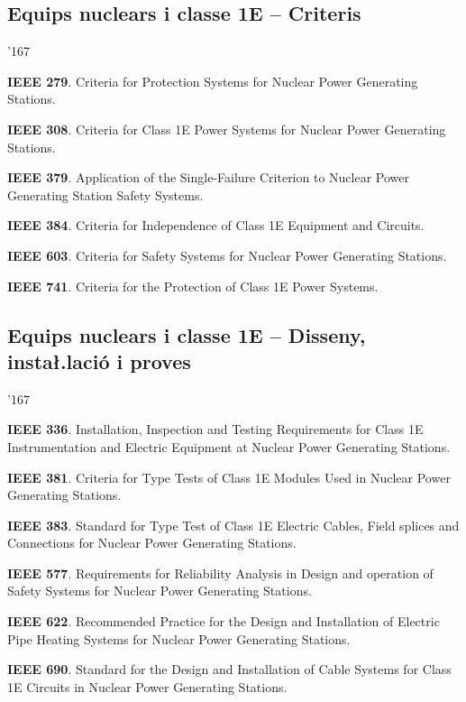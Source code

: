 \subsection*{Equips nuclears i classe 1E -- Criteris} 
\begin{dinglist}{'167}
    \item \textbf{IEEE 279}. Criteria for Protection Systems for Nuclear Power Generating Stations.
    \item \textbf{IEEE 308}. Criteria for Class 1E Power Systems for Nuclear Power Generating Stations.
    \item \textbf{IEEE 379}. Application of the Single-Failure Criterion to Nuclear Power Generating Station Safety Systems.
    \item \textbf{IEEE 384}. Criteria for Independence of Class 1E Equipment and Circuits.
    \item \textbf{IEEE 603}. Criteria for Safety Systems for Nuclear Power Generating Stations.
    \item \textbf{IEEE 741}. Criteria for the Protection of Class 1E Power Systems.
\end{dinglist}


\subsection*{Equips nuclears i classe 1E -- Disseny, insta{\l.l}aci\'{o} i proves}
\begin{dinglist}{'167}
    \item \textbf{IEEE 336}. Installation, Inspection and Testing Requirements for Class 1E Instrumentation and Electric Equipment at Nuclear Power Generating Stations.
     \item \textbf{IEEE 381}. Criteria for Type Tests of Class 1E Modules Used in Nuclear Power Generating Stations.
    \item \textbf{IEEE 383}. Standard for Type Test of Class 1E Electric Cables, Field splices and Connections for Nuclear Power Generating Stations.
    \item \textbf{IEEE 577}. Requirements for Reliability Analysis in Design and operation of Safety Systems for Nuclear Power Generating Stations.
    \item \textbf{IEEE 622}. Recommended Practice for the Design and Installation of Electric Pipe Heating Systems for Nuclear Power Generating Stations.
    \item \textbf{IEEE 690}. Standard for the Design and Installation of Cable Systems for Class 1E Circuits in Nuclear Power Generating Stations.
\end{dinglist}


